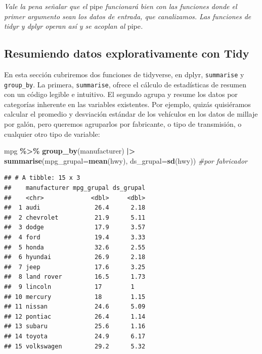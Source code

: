 \documentclass[
]{article}
\newenvironment{Shaded}{\begin{snugshade}}{\end{snugshade}}
\newcommand{\AttributeTok}[1]{\textcolor[rgb]{0.13,0.29,0.53}{#1}}
\newcommand{\CommentTok}[1]{\textcolor[rgb]{0.56,0.35,0.01}{\textit{#1}}}
\newcommand{\FunctionTok}[1]{\textcolor[rgb]{0.13,0.29,0.53}{\textbf{#1}}}
\newcommand{\NormalTok}[1]{#1}
\newcommand{\SpecialCharTok}[1]{\textcolor[rgb]{0.81,0.36,0.00}{\textbf{#1}}}
\begin{document}
\emph{Vale la pena señalar que el} pipe \emph{funcionará bien con las
funciones donde el primer argumento sean los datos de entrada, que
canalizamos. Las funciones de tidyr y dplyr operan así y se acoplan al}
pipe\emph{.}

\subsection{Resumiendo datos explorativamente con
Tidy}\label{resumiendo-datos-explorativamente-con-tidy}

En esta sección cubriremos dos funciones de tidyverse, en dplyr,
\texttt{summarise} y \texttt{group\_by}. La primera, \texttt{summarise},
ofrece el cálculo de estadísticas de resumen con un código legible e
intuitivo. El segundo agrupa y resume los datos por categorías inherente
en las variables existentes. Por ejemplo, quizás quisiéramos calcular el
promedio y desviación estándar de los vehículos en los datos de millaje
por galón, pero queremos agruparlos por fabricante, o tipo de
transmisión, o cualquier otro tipo de variable:

\begin{Shaded}
\begin{Highlighting}[]
\NormalTok{mpg }\SpecialCharTok{\%\textgreater{}\%}
  \FunctionTok{group\_by}\NormalTok{(manufacturer) }\SpecialCharTok{|\textgreater{}}
  \FunctionTok{summarise}\NormalTok{(}\AttributeTok{mpg\_grupal=}\FunctionTok{mean}\NormalTok{(hwy),}
            \AttributeTok{ds\_grupal=}\FunctionTok{sd}\NormalTok{(hwy)) }\CommentTok{\#por fabricador}
\end{Highlighting}
\end{Shaded}

\begin{verbatim}
## # A tibble: 15 x 3
##    manufacturer mpg_grupal ds_grupal
##    <chr>             <dbl>     <dbl>
##  1 audi               26.4      2.18
##  2 chevrolet          21.9      5.11
##  3 dodge              17.9      3.57
##  4 ford               19.4      3.33
##  5 honda              32.6      2.55
##  6 hyundai            26.9      2.18
##  7 jeep               17.6      3.25
##  8 land rover         16.5      1.73
##  9 lincoln            17        1   
## 10 mercury            18        1.15
## 11 nissan             24.6      5.09
## 12 pontiac            26.4      1.14
## 13 subaru             25.6      1.16
## 14 toyota             24.9      6.17
## 15 volkswagen         29.2      5.32
\end{verbatim}
\end{document}
